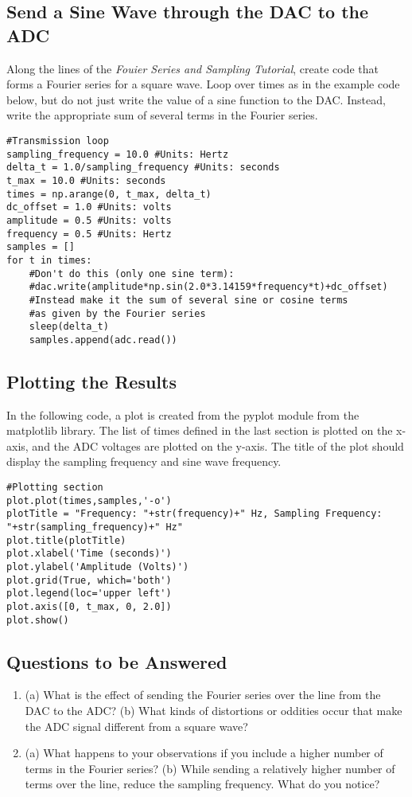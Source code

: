 \documentclass{article}
\begin{document}
\subsection{Send a Sine Wave through the DAC to the ADC}

Along the lines of the \textit{Fouier Series and Sampling Tutorial}, create code that forms a Fourier series for a square wave.  Loop over times as in the example code below, but do not just write the value of a sine function to the DAC.  Instead, write the appropriate sum of several terms in the Fourier series.

\begin{verbatim}
#Transmission loop
sampling_frequency = 10.0 #Units: Hertz
delta_t = 1.0/sampling_frequency #Units: seconds
t_max = 10.0 #Units: seconds
times = np.arange(0, t_max, delta_t)
dc_offset = 1.0 #Units: volts
amplitude = 0.5 #Units: volts
frequency = 0.5 #Units: Hertz
samples = []
for t in times:
	#Don't do this (only one sine term):
    #dac.write(amplitude*np.sin(2.0*3.14159*frequency*t)+dc_offset)
    #Instead make it the sum of several sine or cosine terms
    #as given by the Fourier series
    sleep(delta_t)
    samples.append(adc.read())
\end{verbatim}

\subsection{Plotting the Results}

In the following code, a plot is created from the pyplot module from the matplotlib library.  The list of times defined in the last section is plotted on the x-axis, and the ADC voltages are plotted on the y-axis.  The title of the plot should display the sampling frequency and sine wave frequency.

\begin{verbatim}
#Plotting section
plot.plot(times,samples,'-o')
plotTitle = "Frequency: "+str(frequency)+" Hz, Sampling Frequency: "+str(sampling_frequency)+" Hz"
plot.title(plotTitle)
plot.xlabel('Time (seconds)')
plot.ylabel('Amplitude (Volts)')
plot.grid(True, which='both') 
plot.legend(loc='upper left')
plot.axis([0, t_max, 0, 2.0])
plot.show()
\end{verbatim}

\subsection{Questions to be Answered}

\begin{enumerate}
\item (a) What is the effect of sending the Fourier series over the line from the DAC to the ADC? (b) What kinds of distortions or oddities occur that make the ADC signal different from a square wave? \\ \vspace{3cm}
\item (a) What happens to your observations if you include a higher number of terms in the Fourier series? (b) While sending a relatively higher number of terms over the line, reduce the sampling frequency.  What do you notice?
\end{enumerate}
\end{document}
